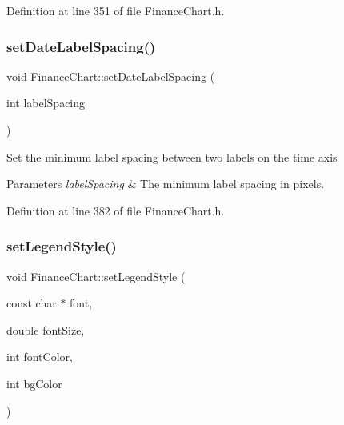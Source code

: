 Definition at line 351 of file Finance\+Chart.\+h.

\mbox{\label{class_finance_chart_a5a1a5cc70635560627b25f8c84a7fb84}} 
\subsubsection{\texorpdfstring{set\+Date\+Label\+Spacing()}{setDateLabelSpacing()}}
{\footnotesize\ttfamily void Finance\+Chart\+::set\+Date\+Label\+Spacing (\begin{DoxyParamCaption}\item[{int}]{label\+Spacing }\end{DoxyParamCaption})\hspace{0.3cm}{\ttfamily [inline]}}



Set the minimum label spacing between two labels on the time axis 


\begin{DoxyParams}{Parameters}
{\em label\+Spacing} & The minimum label spacing in pixels.\\
\hline
\end{DoxyParams}


Definition at line 382 of file Finance\+Chart.\+h.

\mbox{\label{class_finance_chart_ad84cdcdbddfa16a2441ff1e835d18a88}} 
\subsubsection{\texorpdfstring{set\+Legend\+Style()}{setLegendStyle()}}
{\footnotesize\ttfamily void Finance\+Chart\+::set\+Legend\+Style (\begin{DoxyParamCaption}\item[{const char $\ast$}]{font,  }\item[{double}]{font\+Size,  }\item[{int}]{font\+Color,  }\item[{int}]{bg\+Color }\end{DoxyParamCaption})\hspace{0.3cm}{\ttfamily [inline]}}




